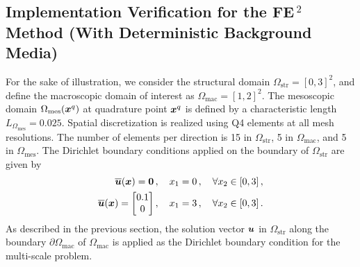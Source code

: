 \subsection[Implementation Verification for the FE2 Method (With Deterministic Background Media)]{Implementation Verification for the FE\,$^2$ Method (With Deterministic Background Media)}
For the sake of illustration, we consider the structural domain $\Omega_{\text{str}} = [0, 3]^2$, and define the macroscopic domain of interest as $\Omega_{\text{mac}} = [1, 2]^2$. The mesoscopic domain $\Omega_{\text{mes}}({\boldsymbol{x}}^{q})$ at quadrature point ${\boldsymbol{x}}^{q}$ is defined by a characteristic length $L_{\Omega_{\text{mes}}} = 0.025$. Spatial discretization is realized using Q4 elements at all mesh resolutions. The number of elements per direction is 15 in $\Omega_\text{str}$, 5 in $\Omega_\text{mac}$, and 5 in $\Omega_{\text{mes}}$. The Dirichlet boundary conditions applied on the boundary of $\Omega_{\text{str}}$ are given by
\begin{align}
    \overline{{\boldsymbol{u}}}({\boldsymbol{x}}) = \mathbf{0}\,, \quad x_1 = 0\,, \quad \forall x_2 \in [0,3]\,,\\
    \overline{{\boldsymbol{u}}}({\boldsymbol{x}}) = \begin{bmatrix}
        0.1 \\ 0 \end{bmatrix}, \quad x_1 = 3\,, \quad \forall x_2 \in [0,3]\,.
\end{align}
As described in the previous section, the solution vector ${\boldsymbol{u}}$ in $\Omega_\text{str}$ along the boundary $\partial \Omega_\text{mac}$ of $\Omega_\text{mac}$ is applied as the Dirichlet boundary condition for the multi-scale problem. 

